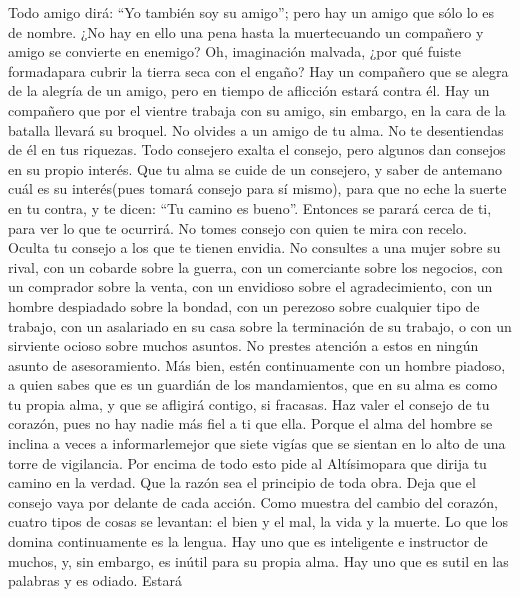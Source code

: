  Todo amigo dirá: ``Yo también soy su amigo''; pero hay un
amigo que sólo lo es de nombre.  ¿No hay en ello una pena
hasta la muertecuando un compañero y amigo se convierte en enemigo?
 Oh, imaginación malvada, ¿por qué fuiste formadapara
cubrir la tierra seca con el engaño?  Hay un compañero que
se alegra de la alegría de un amigo, pero en tiempo de aflicción estará
contra él.  Hay un compañero que por el vientre trabaja
con su amigo, sin embargo, en la cara de la batalla llevará su broquel.
 No olvides a un amigo de tu alma. No te desentiendas de
él en tus riquezas.  Todo consejero exalta el consejo,
pero algunos dan consejos en su propio interés.  Que tu
alma se cuide de un consejero, y saber de antemano cuál es su
interés(pues tomará consejo para sí mismo), para que no eche la suerte
en tu contra,  y te dicen: ``Tu camino es bueno''.
Entonces se parará cerca de ti, para ver lo que te ocurrirá.
 No tomes consejo con quien te mira con recelo. Oculta tu
consejo a los que te tienen envidia.  No consultes a una
mujer sobre su rival, con un cobarde sobre la guerra, con un comerciante
sobre los negocios, con un comprador sobre la venta, con un envidioso
sobre el agradecimiento, con un hombre despiadado sobre la bondad, con
un perezoso sobre cualquier tipo de trabajo, con un asalariado en su
casa sobre la terminación de su trabajo, o con un sirviente ocioso sobre
muchos asuntos. No prestes atención a estos en ningún asunto de
asesoramiento.  Más bien, estén continuamente con un
hombre piadoso, a quien sabes que es un guardián de los mandamientos,
que en su alma es como tu propia alma, y que se afligirá contigo, si
fracasas.  Haz valer el consejo de tu corazón, pues no
hay nadie más fiel a ti que ella.  Porque el alma del
hombre se inclina a veces a informarlemejor que siete vigías que se
sientan en lo alto de una torre de vigilancia.  Por
encima de todo esto pide al Altísimopara que dirija tu camino en la
verdad.  Que la razón sea el principio de toda obra. Deja
que el consejo vaya por delante de cada acción.  Como
muestra del cambio del corazón,  cuatro tipos de cosas se
levantan: el bien y el mal, la vida y la muerte. Lo que los domina
continuamente es la lengua.  Hay uno que es inteligente e
instructor de muchos, y, sin embargo, es inútil para su propia alma.
 Hay uno que es sutil en las palabras y es odiado. Estará
